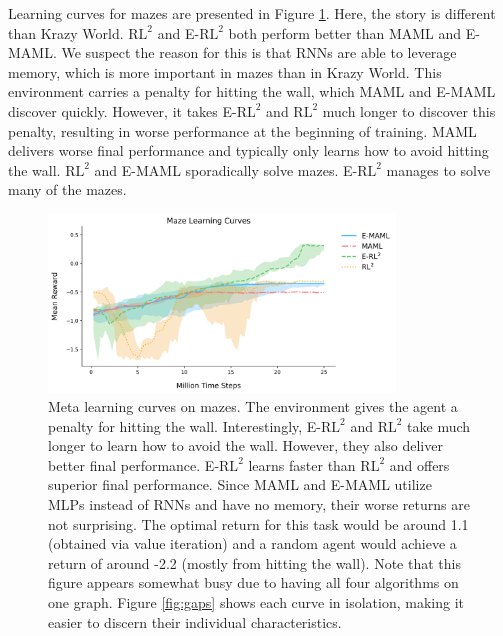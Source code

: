 \documentclass{article} %
\begin{document}
Learning curves for mazes are presented in Figure \ref{fig:learning-curves-1}. Here, the story is different than Krazy World. $\text{RL}^2$ and E-$\text{RL}^2$ both perform better than MAML and E-MAML. We suspect the reason for this is that RNNs are able to leverage memory, which is more important in mazes than in Krazy World. This environment carries a penalty for hitting the wall, which MAML and E-MAML discover quickly. However, it takes E-$\text{RL}^2$ and $\text{RL}^2$ much longer to discover this penalty, resulting in worse performance at the beginning of training. MAML delivers worse final performance and typically only learns how to avoid hitting the wall. $\text{RL}^2$ and E-MAML sporadically solve mazes. E-$\text{RL}^2$ manages to solve many of the mazes. 
\begin{figure}[h]
\begin{center}
\includegraphics[width=0.82\textwidth]{ge_curves/Maze-Learning_Curves.png} 
\end{center}
\caption{Meta learning curves on mazes. The environment gives the agent a penalty for hitting the wall. Interestingly, E-$\text{RL}^2$ and $\text{RL}^2$ take much longer to learn how to avoid the wall. However, they also deliver better final performance. E-$\text{RL}^2$ learns faster than $\text{RL}^2$ and offers superior final performance. Since MAML and E-MAML utilize MLPs instead of RNNs and have no memory, their worse returns are not surprising. The optimal return for this task would be around 1.1 (obtained via value iteration) and a random agent would achieve a return of around -2.2 (mostly from hitting the wall). Note that this figure appears somewhat busy due to having all four algorithms on one graph. Figure \ref{fig:gaps} shows each curve in isolation, making it easier to discern their individual characteristics.} 
\label{fig:learning-curves-1}
\end{figure} 
\end{document}

